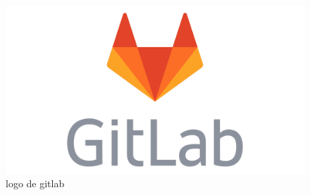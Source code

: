 \documentclass{report}
\begin{document}
\begin{figure}
    \centering
    \includegraphics[scale=0.04]{images/Gitlab-Logo.png}
    \caption{logo de gitlab}
    \label{fig:gitlab}
\end{figure}
\end{document}
